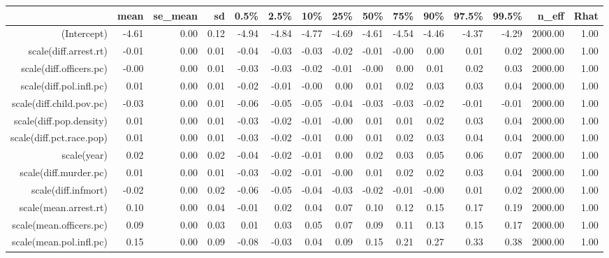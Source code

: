 \begin{table}[ht]
\centering
\begin{tabular}{rrrrrrrrrrrrrrr}
  \hline
 & mean & se\_mean & sd & 0.5\% & 2.5\% & 10\% & 25\% & 50\% & 75\% & 90\% & 97.5\% & 99.5\% & n\_eff & Rhat \\ 
  \hline
(Intercept) & -4.61 & 0.00 & 0.12 & -4.94 & -4.84 & -4.77 & -4.69 & -4.61 & -4.54 & -4.46 & -4.37 & -4.29 & 2000.00 & 1.00 \\ 
  scale(diff.arrest.rt) & -0.01 & 0.00 & 0.01 & -0.04 & -0.03 & -0.03 & -0.02 & -0.01 & -0.00 & 0.00 & 0.01 & 0.02 & 2000.00 & 1.00 \\ 
  scale(diff.officers.pc) & -0.00 & 0.00 & 0.01 & -0.03 & -0.03 & -0.02 & -0.01 & -0.00 & 0.00 & 0.01 & 0.02 & 0.03 & 2000.00 & 1.00 \\ 
  scale(diff.pol.infl.pc) & 0.01 & 0.00 & 0.01 & -0.02 & -0.01 & -0.00 & 0.00 & 0.01 & 0.02 & 0.03 & 0.03 & 0.04 & 2000.00 & 1.00 \\ 
  scale(diff.child.pov.pc) & -0.03 & 0.00 & 0.01 & -0.06 & -0.05 & -0.05 & -0.04 & -0.03 & -0.03 & -0.02 & -0.01 & -0.01 & 2000.00 & 1.00 \\ 
  scale(diff.pop.density) & 0.01 & 0.00 & 0.01 & -0.03 & -0.02 & -0.01 & -0.00 & 0.01 & 0.01 & 0.02 & 0.03 & 0.04 & 2000.00 & 1.00 \\ 
  scale(diff.pct.race.pop) & 0.01 & 0.00 & 0.01 & -0.03 & -0.02 & -0.01 & 0.00 & 0.01 & 0.02 & 0.03 & 0.04 & 0.04 & 2000.00 & 1.00 \\ 
  scale(year) & 0.02 & 0.00 & 0.02 & -0.04 & -0.02 & -0.01 & 0.00 & 0.02 & 0.03 & 0.05 & 0.06 & 0.07 & 2000.00 & 1.00 \\ 
  scale(diff.murder.pc) & 0.01 & 0.00 & 0.01 & -0.03 & -0.02 & -0.01 & -0.00 & 0.01 & 0.02 & 0.02 & 0.03 & 0.04 & 2000.00 & 1.00 \\ 
  scale(diff.infmort) & -0.02 & 0.00 & 0.02 & -0.06 & -0.05 & -0.04 & -0.03 & -0.02 & -0.01 & -0.00 & 0.01 & 0.02 & 2000.00 & 1.00 \\ 
  scale(mean.arrest.rt) & 0.10 & 0.00 & 0.04 & -0.01 & 0.02 & 0.04 & 0.07 & 0.10 & 0.12 & 0.15 & 0.17 & 0.19 & 2000.00 & 1.00 \\ 
  scale(mean.officers.pc) & 0.09 & 0.00 & 0.03 & 0.01 & 0.03 & 0.05 & 0.07 & 0.09 & 0.11 & 0.13 & 0.15 & 0.17 & 2000.00 & 1.00 \\ 
  scale(mean.pol.infl.pc) & 0.15 & 0.00 & 0.09 & -0.08 & -0.03 & 0.04 & 0.09 & 0.15 & 0.21 & 0.27 & 0.33 & 0.38 & 2000.00 & 1.00 \\ 

\end{tabular}
\end{table}
